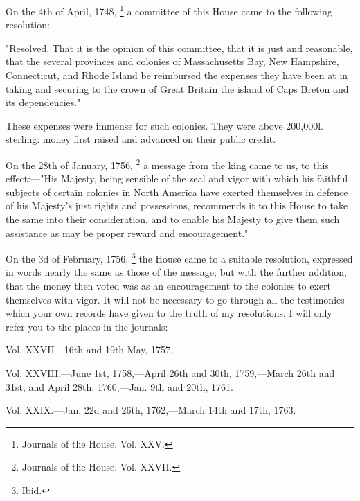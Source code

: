 On the 4th of April, 1748,
\footnote{Journals of the House, Vol. XXV.}
a committee of this House came to the following resolution:—

"Resolved, That it is the opinion of this committee, that it is just and reasonable, that the several provinces and colonies of Massachusetts Bay, New Hampshire, Connecticut, and Rhode Island be reimbursed the expenses they have been at in taking and securing to the crown of Great Britain the island of Caps Breton and its dependencies."

These expenses were immense for such colonies. They were above 200,000l. sterling: money first raised and advanced on their public credit.

On the 28th of January, 1756,
\footnote{Journals of the House, Vol. XXVII.}
a message from the king came to us, to this effect:—"His Majesty, being sensible of the zeal and vigor with which his faithful subjects of certain colonies in North America have exerted themselves in defence of his Majesty's just rights and possessions, recommends it to this House to take the same into their consideration, and to enable his Majesty to give them such assistance as may be proper reward and encouragement."

On the 3d of February, 1756,
\footnote{Ibid.}
the House came to a suitable resolution, expressed in words nearly the same as those of the message; but with the further addition, that the money then voted was as an encouragement to the colonies to exert themselves with vigor. It will not be necessary to go through all the testimonies which your own records have given to the truth of my resolutions. I will only refer you to the places in the journals:—

Vol. XXVII—16th and 19th May, 1757.

Vol. XXVIII.—June 1st, 1758,—April 26th and 30th, 1759,—March 26th and 31st, and April 28th, 1760,—Jan. 9th and 20th, 1761.

Vol. XXIX.—Jan. 22d and 26th, 1762,—March 14th and 17th, 1763.


